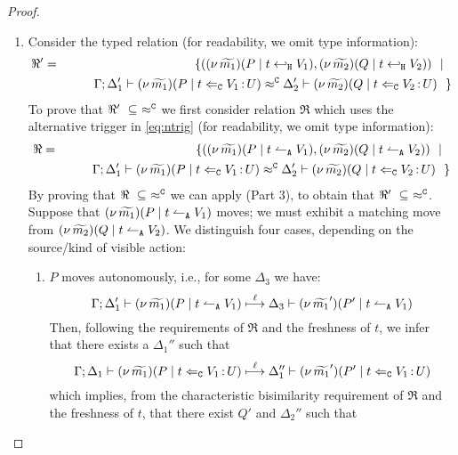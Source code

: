 \begin{proof}
\begin{enumerate}[1.]
		\item	Consider the typed relation (for readability, we omit type information):
				\begin{eqnarray*}
					\Re'	&=&		\{	((\nu\, \widetilde{m_1})(P \;|\; t \hookleftarrow_{\mathtt{H}} V_1),
										(\nu\, \widetilde{m_2})(Q \;|\; t \hookleftarrow_{\mathtt{H}} V_2))
								\ \ |\ \ \\
						&&			\qquad \Gamma; \Delta_1' \vdash (\nu\, \widetilde{m_1})(P \;|\; t \Leftarrow_{\mathtt{C}} V_1{\,:\,}U) \approx^\mathtt{C} \Delta_2' \vdash (\nu\, \widetilde{m_2})(Q \;|\; t \Leftarrow_{\mathtt{C}} V_2{\,:\,}U)~~\}
				\end{eqnarray*}
				To prove that $\Re'\ \subseteq\ \fwb$ we
				first consider relation $\Re$ which uses the alternative trigger in \eqref{eq:ntrig} (for readability, we omit type information):
				\begin{eqnarray*}
					\Re	&=&		\{	((\nu\, \widetilde{m_1})(P \;|\; t \leftharpoonup_\mathtt{A} V_1),
										(\nu\, \widetilde{m_2})(Q \;|\; t \leftharpoonup_\mathtt{A} V_2))
								\ \ |\ \ \\
						&&			\qquad \Gamma; \Delta_1' \vdash (\nu\, \widetilde{m_1})(P \;|\; t \Leftarrow_{\mathtt{C}} V_1{\,:\,}U) \approx^\mathtt{C} \Delta_2' \vdash (\nu\, \widetilde{m_2})(Q \;|\; t \Leftarrow_{\mathtt{C}} V_2{\,:\,}U)~~\}
				\end{eqnarray*}
				By proving that $\Re\ \subseteq\ \fwb$ we can apply  (Part 3), to
				obtain that $\Re'\ \subseteq\ \fwb$.
Suppose that $(\nu\, \widetilde{m_1})(P \;|\; t \leftharpoonup_\mathtt{A} V_1)$ moves; we must exhibit a matching move from
$(\nu\, \widetilde{m_2})(Q \;|\; t \leftharpoonup_\mathtt{A} V_2)$.
			We distinguish four cases, depending on the source/kind of visible action: 
				\begin{enumerate}
					\item $P$ moves autonomously, i.e., for some $\Delta_3$ we have:
						\[
							\Gamma; \Delta_1' \vdash (\nu\, \widetilde{m_1})(P \;|\; t \leftharpoonup_\mathtt{A} V_1) \stackrel{\ell}{\longmapsto} \Delta_3 \vdash (\nu\, \widetilde{m_1}')(P' \;|\; t \leftharpoonup_\mathtt{A} V_1)
						\]
							Then, following the requirements of $\Re$ and the freshness of $t$, 
							we infer that there exists a $\Delta_1''$ such that
						\[
							\Gamma; \Delta_1 \vdash (\nu\, \widetilde{m_1})(P \;|\; t \Leftarrow_{\mathtt{C}} V_1{\,:\,}U) \stackrel{\ell}{\longmapsto} \Delta_1'' \vdash (\nu\, \widetilde{m_1}')(P' \;|\; t \Leftarrow_{\mathtt{C}} V_1{\,:\,}U)
						\]
							which implies, from the characteristic bisimilarity requirement of $\Re$ and
							the freshness of $t$, that there exist $Q'$ and $\Delta_2''$ such that

\end{enumerate}
\end{enumerate}
\end{proof}
